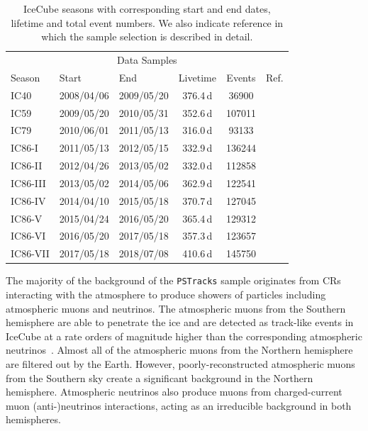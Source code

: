 \documentclass[aps,10pt,prd,twocolumn,floats,letterpaper,showpacs,nofootinbib,bibnotes,notitlepage,superscriptaddress,floatfix]{revtex4-1}
\begin{document}
\begin{table}[t]
\centering
\begin{ruledtabular}
\begin{tabular}{lllccc}
\multicolumn{6}{c}{Data Samples} \\[0.1cm]
Season & Start & End & Livetime & Events & Ref.\\ 
IC40 & 2008/04/06 & 2009/05/20 & 376.4\,d&  36900 & \cite{Abbasi:2010rd} \\
IC59 & 2009/05/20 & 2010/05/31 & 352.6\,d& 107011 &  \cite{Aartsen:2013uuv}\\
IC79 & 2010/06/01 & 2011/05/13 & 316.0\,d&  93133 & \cite{Schatto:2014kbj}\\
IC86-I & 2011/05/13 & 2012/05/15 & 332.9\,d & 136244 & \cite{Aartsen:2014cva} \\
IC86-II & 2012/04/26\footnotemark & 2013/05/02 & 332.0\,d & 112858 & \cite{Aartsen:2019fau} \\
IC86-III & 2013/05/02 & 2014/05/06 & 362.9\,d & 122541 &  \cite{Aartsen:2019fau}\\
IC86-IV & 2014/04/10\footnotemark & 2015/05/18 & 370.7\,d& 127045 & \cite{Aartsen:2019fau}\\
IC86-V & 2015/04/24\footnotemark & 2016/05/20 & 365.4\,d & 129312 & \cite{Aartsen:2019fau}\\
IC86-VI & 2016/05/20 & 2017/05/18 & 357.3\,d& 123657 & \cite{Aartsen:2019fau}\\
IC86-VII & 2017/05/18 & 2018/07/08 & 410.6\,d& 145750 & \cite{Aartsen:2019fau}\\
\end{tabular}
\end{ruledtabular}
\caption[]{IceCube seasons with corresponding start and end dates, lifetime and total event numbers. We also indicate reference in which the sample selection is described in detail.}\label{tab:livetimes}
\end{table}

The majority of the background of the {\tt PSTracks} sample originates from CRs interacting with the atmosphere to produce showers of particles including atmospheric muons and neutrinos. The atmospheric muons from the Southern hemisphere are able to penetrate the ice and are detected as track-like events in IceCube at a rate orders of magnitude higher than the corresponding atmospheric neutrinos~\cite{Aartsen:2016nxy}. Almost all of the atmospheric muons from the Northern hemisphere are filtered out by the Earth. However, poorly-reconstructed atmospheric muons from the Southern sky create a significant background in the Northern hemisphere.
Atmospheric neutrinos also produce muons from charged-current muon (anti-)neutrinos interactions, acting as an irreducible background in both hemispheres. 
\end{document}
